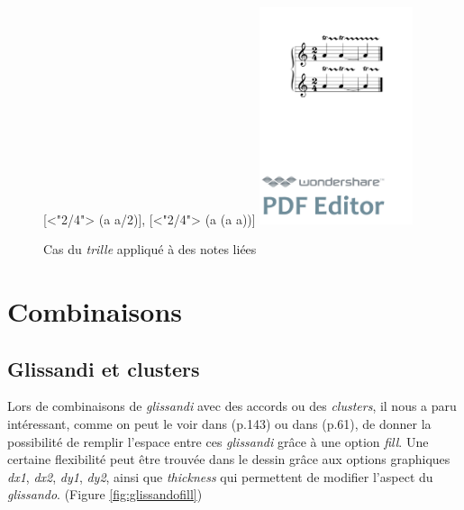 \documentclass{article}
\newenvironment{gmncode}	{\vspace{-2mm}\small\verbatim}{\endverbatim\vspace{-2mm}}
\begin{document}
\begin{figure}[h]
\centering
\begin{gmncode}
{
  [\meter<"2/4"> \trill({a} {a/2})],
  [\meter<"2/4"> \trill({a} \tie({a} {a}))]
}
\end{gmncode}
\includegraphics[width=45mm]{img/trill.pdf}
\caption{Cas du \emph{trille} appliqué à des notes liées}
\label{fig:trill}
\end{figure}

\section{Combinaisons}\label{sec:combinaisons}

\subsection{Glissandi et clusters}\label{subsec:glissandiCluster}

Lors de combinaisons de \emph{glissandi}  avec des accords ou des \emph{clusters}, il nous a paru intéressant, comme on peut le voir dans \cite{gould2011behind} (p.143) ou dans \cite{stone1980music} (p.61), de donner la possibilité de remplir l'espace entre ces \emph{glissandi} grâce à une option \emph{fill}. Une certaine flexibilité peut être trouvée dans le dessin grâce aux options graphiques \emph{dx1}, \emph{dx2}, \emph{dy1}, \emph{dy2}, ainsi que \emph{thickness} qui permettent de modifier l'aspect du \emph{glissando}. (Figure \ref{fig:glissandofill})
\end{document}
